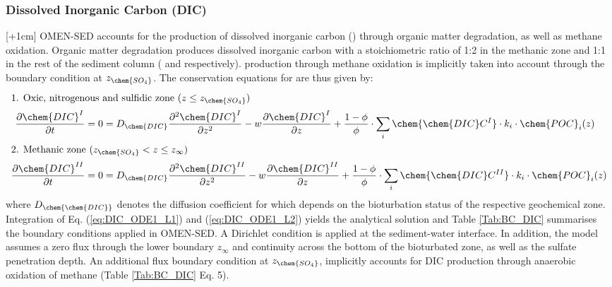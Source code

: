 \documentclass[gmd, manuscript]{copernicus}
\begin{document}
\subsubsection{Dissolved Inorganic Carbon (DIC)}\label{subsubsec:DIC}
[+1cm]%
OMEN-SED accounts for the production of dissolved inorganic carbon () through organic matter degradation, as well as methane oxidation. 
Organic matter degradation produces dissolved inorganic carbon with a stoichiometric  ratio of 1:2 in the methanic zone and 1:1 in the rest of the sediment column ( and  respectively). 
 production through methane oxidation is implicitly taken into account through the boundary condition at $z_{\chem{SO_4}}$. 
The conservation equations for  are thus given by:
\begin{align}
\intertext{1. Oxic, nitrogenous and sulfidic zone ($z \leq z_{\chem{SO_4}}$)}
  \frac{\partial \chem{DIC}^I}{\partial t} &= 0 = D_{\chem{DIC}} \frac{\partial^2\chem{DIC}^I }{\partial z^2} - w\frac{\partial \chem{DIC}^I }{\partial z} + \frac{1-\phi}{\phi} \cdot \sum_i \chem{\chem{DIC}C^I} \cdot k_i \cdot \chem{POC}_{i}(z)\label{eq:DIC_ODE1_L1}\\ %
 \intertext{2. Methanic zone ($z_{\chem{SO_4}} < z \leq z_\infty$)} 
  \frac{\partial \chem{DIC}^{II}}{\partial t} &= 0 = D_{\chem{DIC}} \frac{\partial^2\chem{DIC}^{II} }{\partial z^2} - w\frac{\partial \chem{DIC}^{II} }{\partial z} + \frac{1-\phi}{\phi} \cdot \sum_i \chem{\chem{DIC}C^{II}} \cdot k_i \cdot \chem{POC}_{i}(z)\label{eq:DIC_ODE1_L2} %
\end{align}
where $D_\chem{\chem{DIC}}$ denotes the diffusion coefficient for  which depends on the bioturbation status of the respective geochemical zone. 
Integration of Eq. (\ref{eq:DIC_ODE1_L1}) and (\ref{eq:DIC_ODE1_L2}) yields the analytical solution and Table \ref{Tab:BC_DIC} summarises the boundary conditions applied in OMEN-SED. 
A Dirichlet condition is applied at the sediment-water interface. In addition, the model assumes a zero flux through the lower boundary $z_\infty$ and continuity across the bottom of the bioturbated zone, as well as the sulfate penetration depth. An additional flux boundary condition at $z_{\chem{SO_4}}$, implicitly accounts for DIC production through anaerobic oxidation of methane  (Table \ref{Tab:BC_DIC} Eq. 5).
\end{document}
